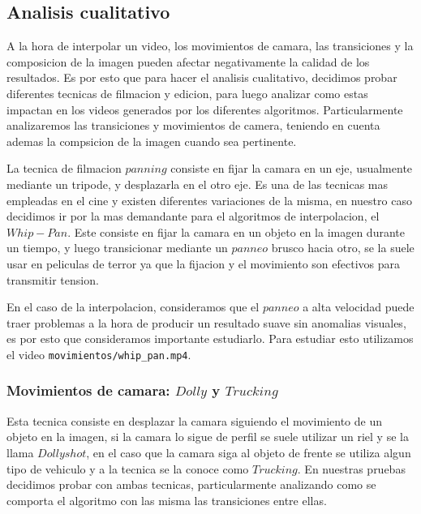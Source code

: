 \subsection{Analisis cualitativo}

A la hora de interpolar un video, los movimientos de camara, las transiciones y la composicion de la imagen pueden afectar negativamente la calidad de los resultados. Es por esto que para hacer el analisis cualitativo, decidimos probar diferentes tecnicas de filmacion y edicion, para luego analizar como estas impactan en los videos generados por los diferentes algoritmos. Particularmente analizaremos las transiciones y movimientos de camera, teniendo en cuenta ademas la compsicion de la imagen cuando sea pertinente.


La tecnica de filmacion $panning$ consiste en fijar la camara en un eje, usualmente mediante un tripode, y desplazarla en el otro eje. Es una de las tecnicas mas empleadas en el cine y existen diferentes variaciones de la misma, en nuestro caso decidimos ir por la mas demandante para el algoritmos de interpolacion, el $Whip-Pan$. Este consiste en fijar la camara en un objeto en la imagen durante un tiempo, y luego transicionar mediante un $panneo$ brusco hacia otro, se la suele usar en peliculas de terror ya que la fijacion y el movimiento son efectivos para transmitir tension.

En el caso de la interpolacion, consideramos que el $panneo$ a alta velocidad puede traer problemas a la hora de producir un resultado suave sin anomalias visuales, es por esto que consideramos importante estudiarlo. Para estudiar esto utilizamos el video \texttt{movimientos/whip_pan.mp4}.

\subsubsection{Movimientos de camara: $Dolly$ y $Trucking$}

Esta tecnica consiste en desplazar la camara siguiendo el movimiento de un objeto en la imagen, si la camara lo sigue de perfil se suele utilizar un riel y se la llama $Dolly shot$, en el caso que la camara siga al objeto de frente se utiliza algun tipo de vehiculo y a la tecnica se la conoce como $Trucking$. En nuestras pruebas decidimos probar con ambas tecnicas, particularmente analizando como se comporta el algoritmo con las misma las transiciones entre ellas.

